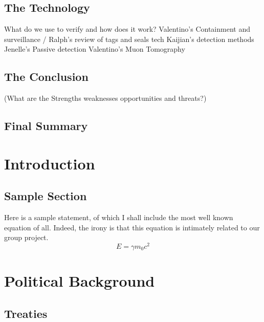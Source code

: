 \documentclass[a4paper]{article}
\begin{document}
\subsection*{The Technology}
	What do we use to verify and how does it work?
Valentino’s Containment and surveillance / Ralph’s review of tags and seals tech
Kaijian’s detection methods
Jenelle’s Passive detection
Valentino’s Muon Tomography 
\subsection*{The Conclusion}
	(What are the Strengths weaknesses opportunities and threats?)
\subsection*{Final Summary}

\tableofcontents

\section{Introduction}
\subsection{Sample Section}
Here is a sample statement, of which I shall 
include the most well known equation of all. 
Indeed, the irony is that this equation is 
intimately related to our group project. 
\[ 
E = \gamma m_0 c^2
\]

\section{Political Background}
\subsection{Treaties}
\end{document}
